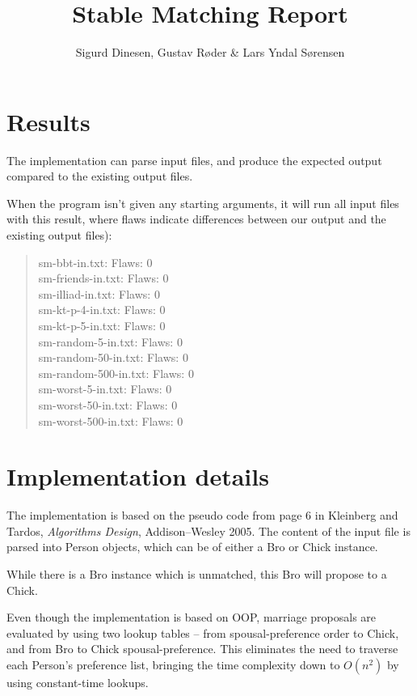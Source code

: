 \documentclass{tufte-handout}
\title{Stable Matching Report}
\author{Sigurd Dinesen, Gustav Røder \& Lars Yndal Sørensen}
\begin{document}
  \maketitle

  \section{Results}
  The implementation can parse input files, and produce the expected output compared to the existing output files.
  
  When the program isn't given any starting arguments, it will run all input files with this result, where flaws indicate differences between our output and the existing output files): 
  \begin{quotation}
 
    sm-bbt-in.txt: Flaws: 0\\
    sm-friends-in.txt: Flaws: 0\\
    sm-illiad-in.txt: Flaws: 0\\
    sm-kt-p-4-in.txt: Flaws: 0\\
    sm-kt-p-5-in.txt: Flaws: 0\\
    sm-random-5-in.txt: Flaws: 0\\
    sm-random-50-in.txt: Flaws: 0\\
    sm-random-500-in.txt: Flaws: 0\\
    sm-worst-5-in.txt: Flaws: 0\\
    sm-worst-50-in.txt: Flaws: 0\\
    sm-worst-500-in.txt: Flaws: 0\\
    
  \end{quotation}

  \section{Implementation details}
	The implementation is based on the pseudo code from page 6 in Kleinberg and Tardos, \emph{Algorithms Design}, Addison--Wesley 2005.%
	The content of the input file is parsed into Person objects, which can be of either a Bro or Chick instance.
	
	While there is a Bro instance which is unmatched, this Bro will propose to a Chick. 
	
	Even though the implementation is based on OOP, marriage proposals are evaluated by using two lookup tables -- from spousal-preference order to Chick, and from Bro to Chick spousal-preference. 
	This eliminates the need to traverse each Person's preference list, bringing the time complexity down to $O (n^2)$ by using constant-time lookups.
\end{document}
